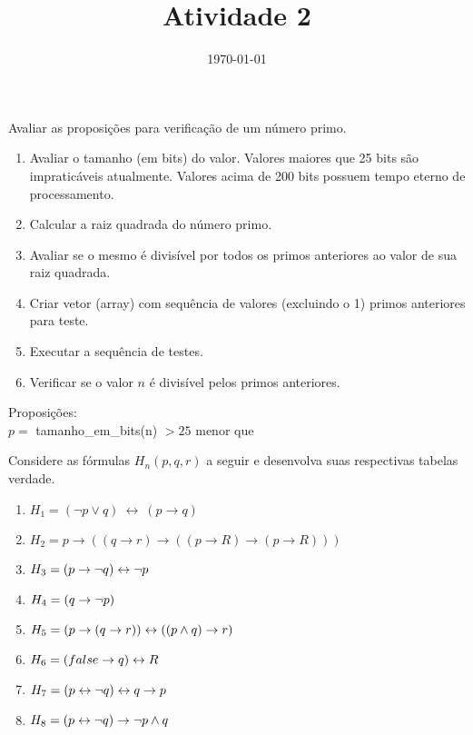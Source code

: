 \documentclass[a4paper, 11pt]{article}
\date{\today}
\title{Atividade 2}
\begin{document}
    \normalfont
    \header{}

    \begin{question}
        Avaliar as proposições para verificação de um número primo.
    \end{question}
    
    \begin{answer}[Resolução]
        \begin{enumerate}[1.]
            \item Avaliar o tamanho (em bits) do valor. Valores maiores que 25 bits são impraticáveis atualmente. Valores acima de 200 bits possuem tempo eterno de processamento. 
            \item Calcular a raiz quadrada do número primo.
            \item Avaliar se o mesmo é divisível por todos os primos anteriores ao valor de sua raiz quadrada.
            \item Criar vetor (array) com sequência de valores (excluindo o 1) primos anteriores para teste.
            \item Executar a sequência de testes. 
            \item Verificar se o valor $n$ é divisível pelos primos anteriores.
        \end{enumerate}
        Proposições: \\[4pt]
        $p=$ tamanho\_em\_bits(n) $>25$ menor que 
    \end{answer}

    \begin{question}
        Considere as fórmulas $H_n(p, q, r)$ a seguir e desenvolva suas respectivas tabelas verdade.
        \begin{enumerate}[\bf \quad a.]
            \item $H_1 = (\lnot p \lor q)~\leftrightarrow~(p \rightarrow q)$
            \item $H_2 = p \rightarrow ((q \rightarrow r) \rightarrow ((p \rightarrow R) \rightarrow (p \rightarrow R)))$ 
            \item $H_3 = (p \rightarrow \lnot q) \leftrightarrow \lnot p $
            \item $H_4 = (q \rightarrow \lnot p) $
            \item $H_5 = (p \rightarrow (q \rightarrow r)) \leftrightarrow ((p \land q) \rightarrow r) $
            \item $H_6 = (false \rightarrow q) \leftrightarrow R$
            \item $H_7 = (p \leftrightarrow \lnot q) \leftrightarrow q \rightarrow p$
            \item $H_8 = (p \leftrightarrow \lnot q) \rightarrow \lnot p \land q$
        \end{enumerate}
    \end{question}
    
\end{document}
